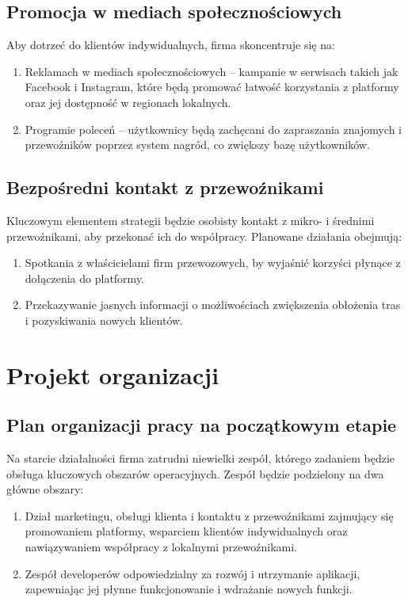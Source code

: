     \subsection{Promocja w mediach społecznościowych}
    Aby dotrzeć do klientów indywidualnych, firma skoncentruje się na:
    \begin{enumerate}
        \item Reklamach w mediach społecznościowych – kampanie w serwisach takich jak Facebook i Instagram, które będą promować łatwość korzystania z platformy oraz jej dostępność w regionach lokalnych.
        \item Programie poleceń – użytkownicy będą zachęcani do zapraszania znajomych i przewoźników poprzez system nagród, co zwiększy bazę użytkowników.
    \end{enumerate}

    \subsection{Bezpośredni kontakt z przewoźnikami}
    Kluczowym elementem strategii będzie osobisty kontakt z mikro- i średnimi przewoźnikami, aby przekonać ich do współpracy. Planowane działania obejmują:
    \begin{enumerate}
        \item Spotkania z właścicielami firm przewozowych, by wyjaśnić korzyści płynące z dołączenia do platformy.
        \item Przekazywanie jasnych informacji o możliwościach zwiększenia obłożenia tras i pozyskiwania nowych klientów.
    \end{enumerate}

\section{Projekt organizacji}

    \subsection {Plan organizacji pracy na początkowym etapie}
    Na starcie działalności firma zatrudni niewielki zespół, którego zadaniem będzie obsługa kluczowych obszarów operacyjnych. Zespół będzie podzielony na dwa główne obszary:
    \begin{enumerate}
        \item Dział marketingu, obsługi klienta i kontaktu z przewoźnikami zajmujący się promowaniem platformy, wsparciem klientów indywidualnych oraz nawiązywaniem współpracy z lokalnymi przewoźnikami.
        \item Zespół developerów odpowiedzialny za rozwój i utrzymanie aplikacji, zapewniając jej płynne funkcjonowanie i wdrażanie nowych funkcji.
    \end{enumerate}
    
